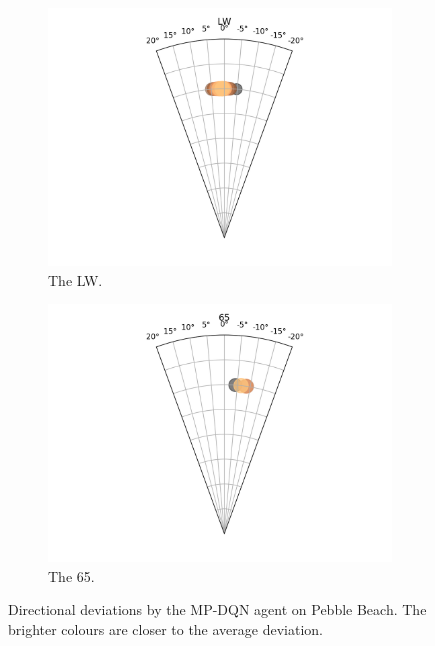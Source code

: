 \documentclass{kththesis}
\begin{document}
\begin{figure}
\begin{subfigure}{0.4\textwidth}
    \centering
    \includegraphics[width=\textwidth]{AgentDirectionChoices/MPDQN_Pebble_Direction_Choices_LW.png} 
    \caption{The LW.}
    \label{fig:LW_pebble_deviation}
    \end{subfigure}
    \begin{subfigure}{0.4\textwidth}
    \centering
    \includegraphics[width=\textwidth]{AgentDirectionChoices/MPDQN_Pebble_Direction_Choices_65.png} 
    \caption{The 65.}
    \label{fig:65_pebble_deviation}
    \end{subfigure}
    \caption{Directional deviations by the MP-DQN agent on Pebble Beach. The brighter colours are closer to the average deviation.}
\end{figure}
\end{document}
